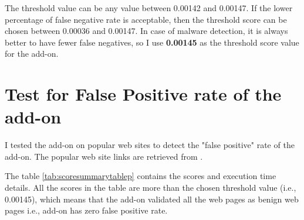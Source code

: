 The threshold value can be any value between 0.00142 and 0.00147. If the lower percentage of false negative rate is acceptable, then the threshold score can be chosen between 0.00036 and 0.00147. In case of malware detection, it is always better to have fewer false negatives, so I use \textbf{0.00145} as the threshold score value for the add-on.

\section{Test for False Positive rate of the add-on}

I tested the add-on on popular web sites to detect the "false positive" rate of the add-on. The popular web site links are retrieved from \cite{bib34}. 

The table \ref{tab:scoresummarytablep} contains the scores and execution time details. All the scores in the table are more than the chosen threshold value (i.e., 0.00145), which means that the add-on validated all the web pages as benign web pages i.e., add-on has zero false positive rate.

